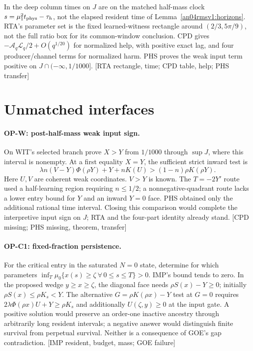 \documentclass[11pt]{article}
\newcommand{\src}[1]{\textnormal{\small[#1]}}
\begin{document}
In the deep column times on \(J\) are on the matched half-mass
clock \(s=\mu_1^2t_{\rm phys}-\tau_h\), not the elapsed resident
time of Lemma~\ref{an04rmsv1:horizons}. RTA's parameter set is
the fixed learned-witness rectangle around \((2/3,5\pi/9)\), not
the full ratio box for its common-window conclusion. CPD gives
\(-\mathcal A_q\mathcal L_q/2+O(q^{1/20})\) for normalized help,
with positive exact lag, and four producer/channel terms for normalized
harm. PHS proves the weak input term positive on
\(J\cap(-\infty,1/1000]\). \src{RTA rectangle, time; CPD table, help; PHS transfer}

\section{Unmatched interfaces}\label{an04rmsv1:open}
\paragraph{OP-W: post-half-mass weak input sign.}
On WIT's selected branch prove \(X>Y\) from \(1/1000\) through
\(\sup J\), where this interval is nonempty. At a first equality
\(X=Y\), the sufficient strict inward test is
\[
 \lambda n(V-Y)\Phi(\rho Y)+Y+nK(U)>(1-n)\rho K(\rho Y).
\]
Here \(U,V\) are coherent weak coordinates. \(V>Y\) is known.
The \(T=-2Y'\) route used a half-learning region requiring \(n\le1/2\);
a nonnegative-quadrant route lacks a lower entry bound for \(Y\)
and an inward \(Y=0\) face. PHS obtained only the additional rational
time interval. Closing this comparison would complete the interpretive
input sign on \(J\); RTA and the four-part identity already stand.
\src{CPD missing; PHS missing, theorem, transfer}

\paragraph{OP-C1: fixed-fraction persistence.}
For the critical entry in the saturated \(N=0\) state, determine for
which parameters \(\inf_T\mu_0\{x(s)\ge\zeta\ \forall\,0\le s\le T\}>0\).
IMP's bound tends to zero. In the proposed wedge \(y\ge x\ge\zeta\),
the diagonal face needs \(\rho S(x)-Y\ge0\); initially
\(\rho S(x)\le\rho K_s<Y\). The alternative \(G=\rho K(\rho x)-Y\)
test at \(G=0\) requires \(2\lambda\Phi(\rho x)U+Y\ge\rho K_s\)
and additionally \(U(\zeta,y)\ge0\) at the input gate. A positive
solution would preserve an order-one inactive ancestry through
arbitrarily long resident intervals; a negative answer would
distinguish finite survival from perpetual survival. Neither is a
consequence of GOE's gap contradiction.
\src{IMP resident, budget, mass; GOE failure}
\end{document}
